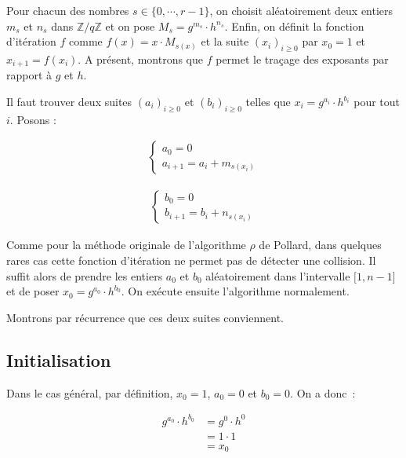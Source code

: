 		Pour chacun des nombres $s \in \{0,\cdots,r-1\}$, on choisit aléatoirement deux entiers $m_s$ et $n_s$ dans $\mathbb{Z}/q\mathbb{Z}$ et on pose $M_s = g^{m_s} \cdot h^{n_s}$. Enfin, on définit la fonction d'itération $f$ comme $f(x) = x \cdot M_{s(x)}$ et la suite $(x_i)_{i \ge 0}$ par $x_0 = 1$ et $x_{i+1} = f(x_i)$. A présent, montrons que $f$ permet le traçage des exposants par rapport à $g$ et $h$.
		
		Il faut trouver deux suites $(a_i)_{i \ge 0}$ et $(b_i)_{i \ge 0}$ telles que $x_i = g^{a_i} \cdot h^{b_i}$ pour tout $i$. Posons :
		
		\begin{align*}
          \begin{cases}
            a_0 = 0 \\
            a_{i+1} = a_i + m_{s(x_i)}
          \end{cases}
        \end{align*}
        
        \begin{align*}
          \begin{cases}
            b_0 = 0 \\
            b_{i+1} = b_i + n_{s(x_i)}
          \end{cases}
        \end{align*}
		
		Comme pour la méthode originale de l'algorithme $\rho$ de Pollard, dans quelques rares cas cette fonction d'itération ne permet pas de détecter une collision. Il suffit alors de prendre les entiers $a_0$ et $b_0$ aléatoirement dans l'intervalle $\mathopen{[}1,n-1\mathclose{]}$ et de poser $x_0 = g^{a_0} \cdot h^{b_0}$. On exécute ensuite l'algorithme normalement.
		
		Montrons par récurrence que ces deux suites conviennent.
		
		\subsection*{Initialisation}
		
		Dans le cas général, par définition, $x_0 = 1$, $a_0 = 0$ et $b_0 = 0$. On a donc~:
		
		\begin{align*}
          g^{a_0} \cdot h^{b_0} &= g^{0} \cdot h^{0} \\
                                &= 1 \cdot 1 \\
                                &= x_0
        \end{align*}
        
